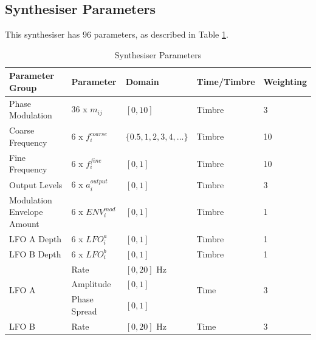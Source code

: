 \documentclass[11pt, oneside]{report}   	%
\begin{document}
\subsection{Synthesiser Parameters}
This synthesiser has 96 parameters, as described in Table \ref{tab:Params}.

\def\arraystretch{1.5}
\begin{table}[]
	\centering
	\caption{Synthesiser Parameters}
	\label{tab:Params}
	\begin{tabular}{|l|l|l|l|l|}
		\hline
		\textbf{Parameter Group}                	 & \textbf{Parameter}     & \textbf{Domain}            & \textbf{Time/Timbre} & \textbf{Weighting} \\ \hline
		Phase Modulation         						& 36 x $m_{ij}$               & $[0, 10]$                  		& Timbre                	& 3									\\ \hline
		Coarse Frequency                            	& 6 x $f_{i}^{coarse}$     & $\{0.5, 1, 2, 3, 4, ...\}$ & Timbre                	& 10									  \\ \hline
		Fine Frequency                                 	   & 6 x $f_{i}^{fine}$         & $[0, 1]$                   		& Timbre                	& 10									  \\ \hline
		Output Levels                                  		& 6 x $a_{i}^{output}$     & $[0, 1]$                   	  & Timbre                	& 3								    	\\ \hline
Modulation Envelope Amount                       & 6 x $ENV_{i}^{mod}$   & $[0, 1]$                   	     & Timbre                  & 1									  \\ \hline
		LFO A Depth                                    		& 6 x $LFO_{i}^{a}$         & $[0, 1]$                   	   & Timbre                  & 1									\\ \hline
		LFO B Depth                                    		& 6 x $LFO_{i}^{b}$        & $[0, 1]$                   	   & Timbre                  & 1									\\ \hline
		\multirow{3}{*}{LFO A}      					& Rate                    		& $[0, 20]$ Hz               	 & \multirow{3}{*}{Time}& \multirow{3}{*}{3} \\
																	  & Amplitude               	& $[0, 1]$                   		&                      				& \\
																	  & Phase Spread         	& $[0, 1]$                   		&                       			&\\ \hline
		\multirow{3}{*}{LFO B}      					& Rate                    		& $[0, 20]$ Hz               	& \multirow{3}{*}{Time}& \multirow{3}{*}{3} \\

\end{tabular}
\end{table}
\end{document}
